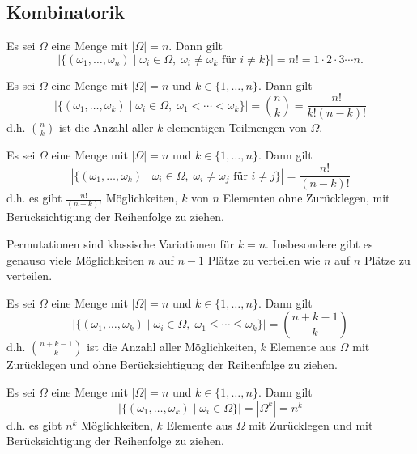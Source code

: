 \documentclass[11pt, a4paper]{article}
\begin{document}
\subsection{Kombinatorik}

\begin{lemma}[Permutationen] \Theorem
    Es sei $\Omega$ eine Menge mit $|\Omega| = n$. Dann gilt
    $$\left|\{(\omega_1, \ldots, \omega_n) \mid \omega_i \in \Omega, \; \omega_i \neq \omega_k \text{ für } i\neq k\}\right| = n! = 1\cdot 2 \cdot 3 \cdots n.$$
\end{lemma}

\begin{lemma} \Theorem
    Es sei $\Omega$ eine Menge mit $|\Omega| = n$ und $k\in \{1 ,\dots ,n \}$. Dann gilt
    $$\left|\{(\omega_1, \ldots, \omega_k) \mid \omega_i \in \Omega, \; \omega_1 < \cdots < \omega_k\}\right| = \binom{n}{k} = \frac{n!}{k!(n-k)!}$$
    d.h. $\binom{n}{k}$ ist die Anzahl aller $k$-elementigen Teilmengen von $\Omega$.
\end{lemma}

\begin{lemma} \Theorem
    Es sei $\Omega$ eine Menge mit $|\Omega| = n$ und $k\in \{1 ,\dots ,n \}$. Dann gilt
    $$\left|\{(\omega_1, \ldots, \omega_k) \mid \omega_i \in \Omega, \; \omega_i \neq \omega_j \text{ für } i\neq j\}\right| = \frac{n!}{(n-k)!}$$
    d.h. es gibt $\frac{n!}{(n-k)!}$ Möglichkeiten, $k$ von $n$ Elementen ohne Zurücklegen, mit Berücksichtigung der Reihenfolge zu ziehen.
\end{lemma}

\begin{note}
     Permutationen sind klassische Variationen für $k=n$. Insbesondere gibt es genauso viele Möglichkeiten $n$ auf $n-1$ Plätze zu verteilen wie $n$ auf $n$ Plätze zu verteilen.
\end{note}
\begin{lemma}
    Es sei $\Omega$ eine Menge mit $|\Omega| = n$ und $k\in \{1 ,\dots ,n \}$. Dann gilt
    $$\left|\{(\omega_1, \ldots, \omega_k) \mid \omega_i \in \Omega, \; \omega_1 \leqslant \cdots \leqslant \omega_k\}\right| = \binom{n+k-1}{k}$$
    d.h. $\binom{n+k-1}{k}$ ist die Anzahl aller Möglichkeiten, $k$ Elemente aus $\Omega$ mit Zurücklegen und ohne Berücksichtigung der Reihenfolge zu ziehen.
\end{lemma}

\begin{lemma}
    Es sei $\Omega$ eine Menge mit $|\Omega| = n$ und $k\in \{1 ,\dots ,n \}$. Dann gilt
    $$\left|\{(\omega_1, \ldots, \omega_k) \mid \omega_i \in \Omega\}\right| = |\Omega^k| = n^k$$
    d.h. es gibt $n^k$ Möglichkeiten, $k$ Elemente aus $\Omega$ mit Zurücklegen und mit Berücksichtigung der Reihenfolge zu ziehen.
\end{lemma}
\end{document}
